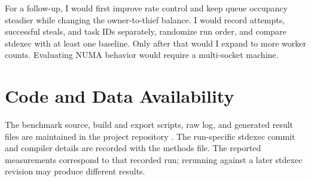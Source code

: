 \documentclass[conference]{IEEEtran}
\begin{document}
For a follow-up, I would first improve rate control and keep queue occupancy steadier while changing the owner-to-thief balance. I would record attempts, successful steals, and task IDs separately, randomize run order, and compare stdexec with at least one baseline. Only after that would I expand to more worker counts. Evaluating NUMA behavior would require a multi-socket machine.

\section*{Code and Data Availability}
The benchmark source, build and export scripts, raw log, and generated result files are maintained in the project repository \cite{aibak2026bwos}. The run-specific stdexec commit and compiler details are recorded with the methods file. The reported measurements correspond to that recorded run; rerunning against a later stdexec revision may produce different results.



\end{document}
